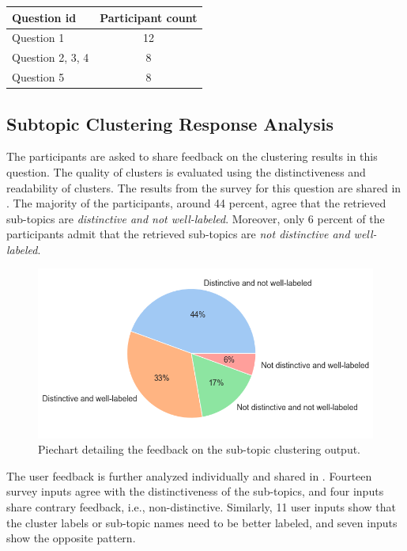 \begin{center}
	\label{tab:participant_cnts}
	\begin{tabularx}{.6\textwidth}{|Y|c|}
		\hline
		Question id & Participant count \\
		\hline
		Question 1 & 12 \\
		\hline
		Question 2, 3, 4 & 8 \\
		\hline
		Question 5 & 8 \\
		\hline
	\end{tabularx}
\end{center}

\subsection{Subtopic Clustering Response Analysis}

The participants are asked to share feedback on the clustering results in this question. The quality of clusters is evaluated using the distinctiveness and readability of clusters. The results from the survey for this question are shared in . The majority of the participants, around 44 percent, agree that the retrieved sub-topics are \textit{distinctive and not well-labeled}. Moreover, only 6 percent of the participants admit that the retrieved sub-topics are \textit{not distinctive and well-labeled}.

\begin{figure}[h]
	\centering
	\includegraphics[width=.8\textwidth]{images/subplots/rating_piecharts.png}
	\caption[Sub-topic clustering output feedback.]{Piechart detailing the feedback on the sub-topic clustering output. \label{fig:question_1_piechart}}
\end{figure}

The user feedback is further analyzed individually and shared in . Fourteen survey inputs agree with the distinctiveness of the sub-topics, and four inputs share contrary feedback, i.e., non-distinctive. Similarly, 11 user inputs show that the cluster labels or sub-topic names need to be better labeled, and seven inputs show the opposite pattern.

